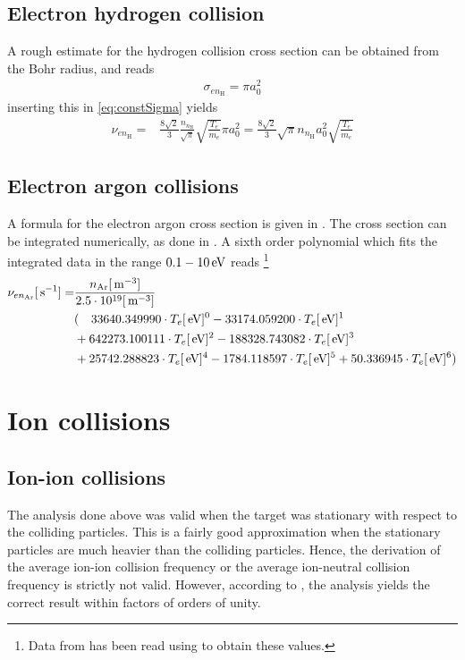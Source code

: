 \subsection{Electron hydrogen collision}
A rough estimate for the hydrogen collision cross section can be obtained from the Bohr radius, and reads
%
\begin{align*}
    \sigma_{en_\text{H}} = \pi a_0^2
\end{align*}
%
inserting this in \cref{eq:constSigma} yields
%
\begin{align*}
    \nu_{en_\text{H}}
    =&
    \frac{8\sqrt{2}}{3}
    \frac{n_{n_\text{H}} }{\sqrt{\pi}}
    \sqrt{ \frac{T_e}{m_e}}
    \pi a_0^2
    =
    \frac{8\sqrt{2}}{3}
    \sqrt{\pi} n_{n_\text{H}}  a_0^2
    \sqrt{ \frac{T_e}{m_e}}
\end{align*}
%

\subsection{Electron argon collisions}
%
A formula for the electron argon cross section is given in \cite{Hayashi1981}.
The cross section can be integrated numerically, as done in \cite{Schroder2003Phd}.
A sixth order polynomial which fits the integrated data in the range $0.1 - 10 \, \text{eV}$ reads%
%
\footnote{Data from \cite{Schroder2003Phd} has been read using \cite{Ankit2016Web} to obtain these values.}
%
\begin{align*}
    \nu_{en_\text{Ar}}[\, \text{s}^{-1}]
    =&
    \frac{n_{\text{Ar}}[\, \text{m}^{-3}]}{2.5\cdot10^{19}[\, \text{m}^{-3}]}
    \\
    &
    (
    \quad 33640.349990\cdot T_e[\, \text{eV}]^0 -33174.059200\cdot T_e[\, \text{eV}]^1\\
&+642273.100111\cdot T_e[\, \text{eV}]^2 -188328.743082\cdot T_e[\, \text{eV}]^3\\
&+25742.288823\cdot T_e[\, \text{eV}]^4 -1784.118597\cdot T_e[\, \text{eV}]^5 +50.336945\cdot T_e[\, \text{eV}]^6)
\end{align*}

\section{Ion collisions}
\label{sec:nui}
%
\subsection{Ion-ion collisions}
The analysis done above was valid when the target was stationary with respect to the colliding particles.
This is a fairly good approximation when the stationary particles are much heavier than the colliding particles.
Hence, the derivation of the average ion-ion collision frequency or the average ion-neutral collision frequency is strictly not valid.
However, according to \cite{Goldston1995book}, the analysis yields the correct result within factors of orders of unity.

